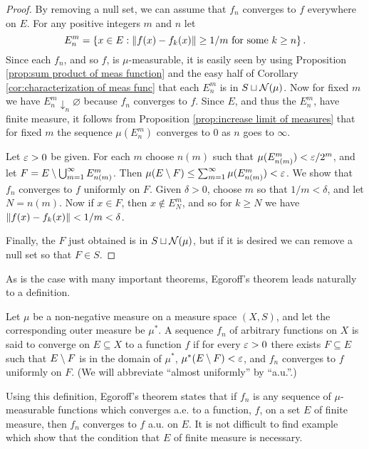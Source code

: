 \begin{proof}
By removing a null set, we can assume that $f_n$ converges to $f$ everywhere on $E$. For any positive integers $m$ and $n$ let \[E_n^m=\left\{x\in E:\norm{f(x)-f_k(x)}\geq 1/m\text{ for some }k\geq n\right\}.\] Since each $f_n$, and so $f$, is $\mu$-measurable, it is easily seen by using Proposition \ref{prop:sum product of meas function} and the easy half of Corollary \ref{cor:characterization of meas func} that each $E_n^m$ is in $S \sqcup{\cal N}(\mu)$. Now for fixed $m$ we have $E_n^m\downarrow_n\varnothing$ because $f_n$ converges to $f$. Since $E$, and thus the $E_n^m$, have finite measure, it follows from Proposition \ref{prop:increase limit of measures} that for fixed $m$ the sequence $\mu(E_n^m)$ converges to $0$ as $n$ goes to $\infty$.

Let $\varepsilon>0$ be given. For each $m$ choose $n(m)$ such that $\mu(E_{n(m)}^m)<\varepsilon/2^m$, and let $F=E\setminus\bigcup_{m=1}^\infty E_{n(m)}^m$. Then $\mu(E\setminus F)\leq\sum_{m=1}^\infty\mu(E_{n(m)}^m)<\varepsilon$. We show that $f_n$ converges to $f$ uniformly on $F$. Given $\delta>0$, choose $m$ so that $1/m<\delta$, and let $N=n(m)$. Now if $x\in F$, then $x\notin E_N^m$, and so for $k\geq N$ we have $\norm{f(x)-f_k(x)}<1/m<\delta$.

Finally, the $F$ just obtained is in $S\sqcup{\cal N}(\mu)$, but if it is desired we can remove a null set so that $F\in S$.
\end{proof}

As is the case with many important theorems, Egoroff's theorem leads naturally to a definition.

\begin{definition}
Let $\mu$ be a non-negative measure on a measure space $(X,S)$, and let the corresponding outer measure be $\mu^*$. A sequence $f_n$ of arbitrary functions on $X$ is said to converge  on $E\subseteq X$ to a function $f$ if for every $\varepsilon>0$ there exists $F\subseteq E$ such that $E\setminus F$ is in the domain of $\mu^*$, $\mu^*(E\setminus F)<\varepsilon$, and $f_n$ converges to $f$ uniformly on $F$. (We will abbreviate ``almost uniformly'' by ``a.u.''.)
\end{definition}

Using this definition, Egoroff's theorem states that if $f_n$ is any sequence of $\mu$-measurable functions which converges a.e. to a function, $f$, on a set $E$ of finite measure, then $f_n$ converges to $f$ a.u. on $E$. It is not difficult to find example which show that the condition that $E$ of finite measure is necessary.

